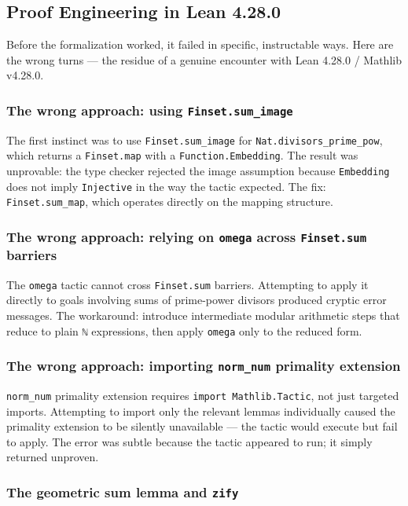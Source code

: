 \documentclass[12pt,a4paper]{article}
\begin{document}
\subsection{Proof Engineering in Lean 4.28.0}

Before the formalization worked, it failed in specific, instructable ways. Here are the wrong turns --- the residue of a genuine encounter with Lean 4.28.0 / Mathlib v4.28.0.

\subsubsection{The wrong approach: using \texttt{Finset.sum\_image}}

The first instinct was to use \texttt{Finset.sum\_image} for \texttt{Nat.divisors\_prime\_pow}, which returns a \texttt{Finset.map} with a \texttt{Function.Embedding}. The result was unprovable: the type checker rejected the image assumption because \texttt{Embedding} does not imply \texttt{Injective} in the way the tactic expected. The fix: \texttt{Finset.sum\_map}, which operates directly on the mapping structure.

\subsubsection{The wrong approach: relying on \texttt{omega} across \texttt{Finset.sum} barriers}

The \texttt{omega} tactic cannot cross \texttt{Finset.sum} barriers. Attempting to apply it directly to goals involving sums of prime-power divisors produced cryptic error messages. The workaround: introduce intermediate modular arithmetic steps that reduce to plain \texttt{ℕ} expressions, then apply \texttt{omega} only to the reduced form.

\subsubsection{The wrong approach: importing \texttt{norm\_num} primality extension}

\texttt{norm\_num} primality extension requires \texttt{import Mathlib.Tactic}, not just targeted imports. Attempting to import only the relevant lemmas individually caused the primality extension to be silently unavailable --- the tactic would execute but fail to apply. The error was subtle because the tactic appeared to run; it simply returned unproven.

\subsubsection{The geometric sum lemma and \texttt{zify}}
\end{document}
